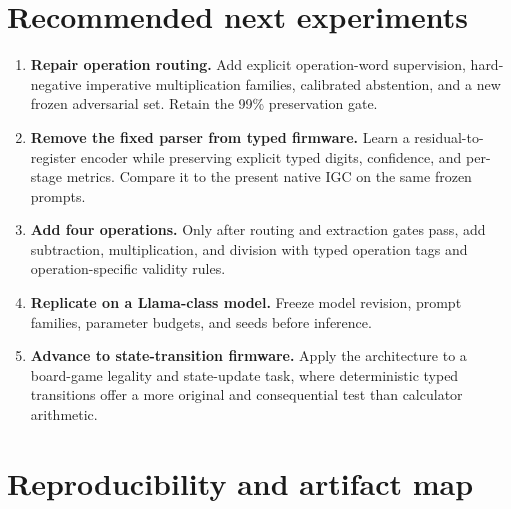 \documentclass[11pt]{article}
\begin{document}
\section{Recommended next experiments}

\begin{enumerate}
  \item \textbf{Repair operation routing.} Add explicit operation-word
  supervision, hard-negative imperative multiplication families, calibrated
  abstention, and a new frozen adversarial set. Retain the 99\% preservation
  gate.
  \item \textbf{Remove the fixed parser from typed firmware.} Learn a
  residual-to-register encoder while preserving explicit typed digits,
  confidence, and per-stage metrics. Compare it to the present native IGC on
  the same frozen prompts.
  \item \textbf{Add four operations.} Only after routing and extraction gates
  pass, add subtraction, multiplication, and division with typed operation
  tags and operation-specific validity rules.
  \item \textbf{Replicate on a Llama-class model.} Freeze model revision,
  prompt families, parameter budgets, and seeds before inference.
  \item \textbf{Advance to state-transition firmware.} Apply the architecture
  to a board-game legality and state-update task, where deterministic typed
  transitions offer a more original and consequential test than calculator
  arithmetic.
\end{enumerate}

\section{Reproducibility and artifact map}
\end{document}
